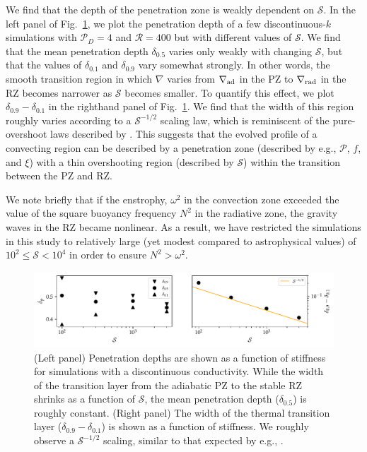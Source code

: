 \documentclass{aastex631}
\newcommand{\gradrad}{\ensuremath{\nabla_{\rm{rad}}}}
\newcommand{\gradad}{\ensuremath{\nabla_{\rm{ad}}}}
\newcommand{\justgrad}{\ensuremath{\nabla}}
\newcommand{\mP}{\ensuremath{\mathcal{P}}}
\newcommand{\mR}{\ensuremath{\mathcal{R}}}
\newcommand{\mS}{\ensuremath{\mathcal{S}}}
\begin{document}
We find that the depth of the penetration zone is weakly dependent on $\mS$.
In the left panel of Fig.~\ref{fig:parameters_vs_s}, we plot the penetration depth of a few discontinuous-$k$ simulations with $\mP_D = 4$ and $\mR = 400$ but with different values of $\mS$.
We find that the mean penetration depth $\delta_{0.5}$ varies only weakly with changing $\mS$, but that the values of $\delta_{0.1}$ and $\delta_{0.9}$ vary somewhat strongly.
In other words, the smooth transition region in which $\justgrad$ varies from $\gradad$ in the PZ to $\gradrad$ in the RZ becomes narrower as $\mS$ becomes smaller.
To quantify this effect, we plot $\delta_{0.9} - \delta_{0.1}$ in the righthand panel of Fig.~\ref{fig:parameters_vs_s}.
We find that the width of this region roughly varies according to a $\mS^{-1/2}$ scaling law, which is reminiscent of the pure-overshoot laws described by \citet{korre_etal_2019}.
This suggests that the evolved profile of a convecting region can be described by a penetration zone (described by e.g., $\mP$, $f$, and $\xi$) with a thin overshooting region (described by $\mS$) within the transition between the PZ and RZ.

We note briefly that if the enstrophy, $\omega^2$ in the convection zone exceeded the value of the square buoyancy frequency $N^2$ in the radiative zone, the gravity waves in the RZ became nonlinear.
As a result, we have restricted the simulations in this study to relatively large (yet modest compared to astrophysical values) of $10^{2} \leq \mS < 10^4$ in order to ensure $N^2 > \omega^2$.

\begin{figure}[t!]
\centering
\includegraphics{parameters_vs_s.pdf}
\caption{
(Left panel) Penetration depths are shown as a function of stiffness for simulations with a discontinuous conductivity.
While the width of the transition layer from the adiabatic PZ to the stable RZ shrinks as a function of $\mS$, the mean penetration depth ($\delta_{0.5}$) is roughly constant.
(Right panel) The width of the thermal transition layer ($\delta_{0.9} - \delta_{0.1}$) is shown as a function of stiffness.
We roughly observe a $\mS^{-1/2}$ scaling, similar to that expected by e.g., \citet{korre_etal_2019}.
\label{fig:parameters_vs_s}
}
\end{figure}
\end{document}
